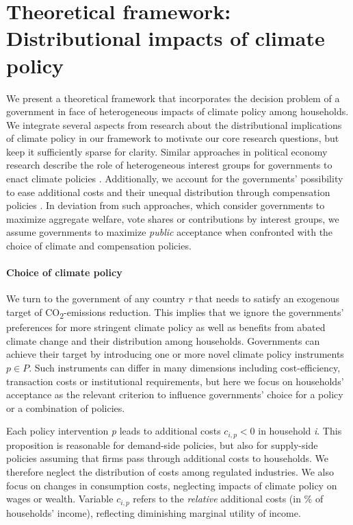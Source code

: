 \documentclass[12pt, a4paper]{article}
\begin{document}
\section{Theoretical framework: Distributional impacts of climate policy} \label{sec:literature}

We present a theoretical framework that incorporates the decision problem of a government in face of heterogeneous impacts of climate policy among households. We integrate several aspects from research about the distributional implications of climate policy in our framework to motivate our core research questions, but keep it sufficiently sparse for clarity. Similar approaches in political economy research describe the role of heterogeneous interest groups for governments to enact climate policies \autocite{Aidt.1998,Fredriksson.1997}. Additionally, we account for the governments' possibility to ease additional costs and their unequal distribution through compensation policies \autocite{Lindbeck.1987,Aidt.1998,Cremer.2004}. In deviation from such approaches, which consider governments to maximize aggregate welfare, vote shares or contributions by interest groups, we assume governments to maximize \textit{public} acceptance \autocite[e.g.,][]{Downs.1957,Stigler.1971} when confronted with the choice of climate and compensation policies. 

\paragraph{Choice of climate policy} 
We turn to the government of any country \textit{r} that needs to satisfy an exogenous target of CO\textsubscript{2}-emissions reduction. This implies that we ignore the governments' preferences for more stringent climate policy as well as benefits from abated climate change and their distribution among households. Governments can achieve their target by introducing one or more novel climate policy instruments $p \in P$. Such instruments can differ in many dimensions including cost-efficiency, transaction costs or institutional requirements, but here we focus on households' acceptance as the relevant criterion to influence governments' choice for a policy or a combination of policies.

Each policy intervention \textit{p} leads to additional costs $c_{i,p}<0$ in household \textit{i}. This proposition is reasonable for demand-side policies, but also for supply-side policies assuming that firms pass through additional costs to households. We therefore neglect the distribution of costs among regulated industries. We also focus on changes in consumption costs, neglecting impacts of climate policy on wages or wealth. Variable $c_{i,p}$ refers to the \textit{relative} additional costs (in \% of households' income), reflecting diminishing marginal utility of income.
\end{document}
